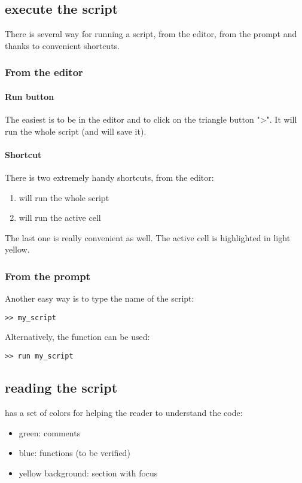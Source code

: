 	\subsection{execute the script}
		There is several way for running a script, from the editor, from the prompt and thanks to convenient shortcuts.
		\subsubsection{From the editor}
			\paragraph{Run button}
				The easiest is to be in the editor and to click on the triangle button "\textgreater".
				It will run the whole script (and will save it).
		
			\paragraph{Shortcut}
				There is two extremely handy shortcuts, from the editor:
				\begin{enumerate}
					\item {} will run the whole script
					\item {} will run the active cell
				\end{enumerate}
				The last one is really convenient as well.
				The active cell is highlighted in light yellow.

			\subsubsection{From the prompt}
			Another easy way is to type the name of the script:
\begin{lstlisting}
>> my_script
\end{lstlisting}
			Alternatively, the function  can be used:
\begin{lstlisting}
>> run my_script
\end{lstlisting}

	\subsection{reading the script}
		\matlab has a set of colors for helping the reader to understand the code:
		\begin{itemize}
			\item green: comments
			\item blue: functions (to be verified)
			\item yellow background: section with focus
		\end{itemize}
